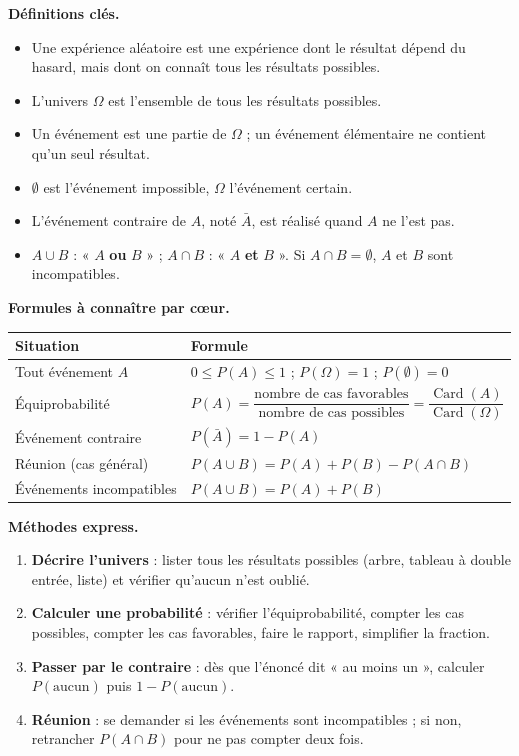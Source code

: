 \documentclass[11pt]{article}
\newcommand{\cle}[1]{{\popxbold\color{popdark}#1}}
\begin{document}
\begin{aretenir}
\textbf{Définitions clés.}
\begin{itemize}
  \item Une \cle{expérience aléatoire} est une expérience dont le résultat dépend du hasard, mais dont on connaît tous les résultats possibles.
  \item L'\cle{univers} $\Omega$ est l'ensemble de tous les résultats possibles.
  \item Un \cle{événement} est une partie de $\Omega$ ; un \cle{événement élémentaire} ne contient qu'un seul résultat.
  \item $\emptyset$ est l'événement \cle{impossible}, $\Omega$ l'événement \cle{certain}.
  \item L'\cle{événement contraire} de $A$, noté $\bar{A}$, est réalisé quand $A$ ne l'est pas.
  \item $A\cup B$ : « $A$ \textbf{ou} $B$ » ; $A\cap B$ : « $A$ \textbf{et} $B$ ». Si $A\cap B=\emptyset$, $A$ et $B$ sont \cle{incompatibles}.
\end{itemize}

\textbf{Formules à connaître par cœur.}
\begin{center}
\begin{tabularx}{\linewidth}{|l|X|}
\hline
\rowcolor{popblueL} \textbf{Situation} & \textbf{Formule} \\
\hline
Tout événement $A$ & $0 \le P(A) \le 1$ ; \quad $P(\Omega)=1$ ; \quad $P(\emptyset)=0$ \\
\hline
Équiprobabilité & $P(A)=\dfrac{\text{nombre de cas favorables}}{\text{nombre de cas possibles}}=\dfrac{\operatorname{Card}(A)}{\operatorname{Card}(\Omega)}$ \\
\hline
Événement contraire & $P(\bar{A})=1-P(A)$ \\
\hline
Réunion (cas général) & $P(A\cup B)=P(A)+P(B)-P(A\cap B)$ \\
\hline
Événements incompatibles & $P(A\cup B)=P(A)+P(B)$ \\
\hline
\end{tabularx}
\end{center}

\textbf{Méthodes express.}
\begin{enumerate}
  \item \textbf{Décrire l'univers} : lister tous les résultats possibles (arbre, tableau à double entrée, liste) et vérifier qu'aucun n'est oublié.
  \item \textbf{Calculer une probabilité} : vérifier l'équiprobabilité, compter les cas possibles, compter les cas favorables, faire le rapport, simplifier la fraction.
  \item \textbf{Passer par le contraire} : dès que l'énoncé dit « au moins un », calculer $P(\text{aucun})$ puis $1-P(\text{aucun})$.
  \item \textbf{Réunion} : se demander si les événements sont incompatibles ; si non, retrancher $P(A\cap B)$ pour ne pas compter deux fois.
\end{enumerate}
\end{aretenir}
\end{document}
